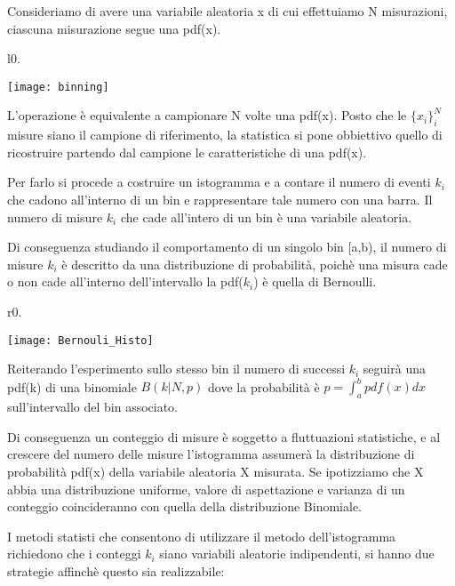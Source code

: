 \documentclass[11pt,a4paper]{book}
\begin{document}
Consideriamo di avere una variabile aleatoria x di cui effettuiamo N misurazioni, ciascuna misurazione segue una pdf(x). 

\begin{wrapfigure}{l}{0.\textwidth}
\centering

\texttt{[image: binning]}	

\end{wrapfigure}

\noindent L'operazione \`{e} equivalente a campionare N volte una pdf(x). Posto che le $\{x_{i}\}_{i}^N$ misure siano il campione di riferimento, la statistica si pone obbiettivo quello di ricostruire partendo dal campione le caratteristiche di una pdf(x).

\noindent Per farlo si procede a costruire un istogramma e a contare il numero di eventi $k_{i}$ che cadono all'interno di un bin e rappresentare tale numero con una barra. Il numero di misure $k_i$ che cade all'intero di un bin \`{e} una variabile aleatoria.

Di conseguenza studiando il comportamento di un singolo bin [a,b), il numero di misure $k_{i}$ \`{e} descritto da una distribuzione di probabilit\`{a}, poich\`{e} una misura cade o non cade all'interno dell'intervallo la pdf($k_i$) \`{e} quella di Bernoulli. 
\begin{wrapfigure}{r}{0.\textwidth}
\centering

\texttt{[image: Bernouli\_Histo]}	

\end{wrapfigure}
Reiterando l'esperimento sullo stesso bin il numero di successi $k_{i}$ seguir\`{a} una pdf(k) di una binomiale $B(k \vert N,p)$ dove la probabilit\`{a} \`{e} $ p = \int_{a}^{b}{pdf(x)dx}$ sull'intervallo del bin associato.

Di conseguenza un conteggio di misure \`{e} soggetto a fluttuazioni statistiche, e al crescere del numero delle misure l'istogramma assumer\`{a} la distribuzione di probabilit\`{a} pdf(x) della variabile aleatoria X misurata.
\newline
\noindent Se ipotizziamo che X abbia una distribuzione uniforme, valore di aspettazione e varianza di un conteggio coincideranno con quella della distribuzione Binomiale.

I metodi statisti che consentono di utilizzare il metodo dell'istogramma richiedono che i conteggi $k_{i}$ siano variabili aleatorie indipendenti, si hanno due strategie affinch\`{e} questo sia realizzabile:
\end{document}

